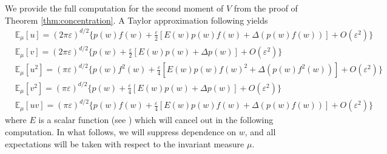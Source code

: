 \documentclass[11pt]{article}
\theoremstyle{plain}
\theoremstyle{definition}
\theoremstyle{remark}
\numberwithin{equation}{section}
\newcommand{\veps}{\varepsilon}
\newcommand{\E}{\mathbb{E}}
\begin{document}
\setcounter{table}{0}
\setcounter{figure}{0}
\renewcommand{\thetable}{D.\arabic{table}}
\renewcommand{\thefigure}{D.\arabic{figure}}
We provide the full computation for the second moment of $V$ from the proof of Theorem \ref{thm:concentration}. A Taylor approximation following \citet[Equation (28)]{singer2008nonlinear} yields
\begin{align*}
&\E_\mu [u]=(2\pi \veps)^{d/2} \{p(w) f(w)+\frac{\veps}{2}[E(w) p(w) f(w)+ \Delta (p(w) f(w))]+O(\veps^2) \}\\
&\E_\mu [v]=(2\pi \veps)^{d/2} \{p(w)+\frac{\veps}{2}[E(w) p(w) + \Delta p(w)]+O(\veps^2) \}\\
&\E_\mu [u^2]=(\pi \veps)^{d/2} \{p(w) f^2(w)+\frac{\veps}{4}[E(w) p(w) f(w)^2+ \Delta (p(w) f^2(w))]+O(\veps^2) \}\\
&\E_\mu [v^2]=(\pi \veps)^{d/2} \{p(w)+\frac{\veps}{4}[E(w) p(w) + \Delta p(w)]+O(\veps^2) \}\\
&\E_\mu [u v]=(\pi \veps)^{d/2} \{p(w) f(w) +\frac{\veps}{4}[E(w) p(w) f(w)  + \Delta (p(w) f(w))]+O(\veps^2) \}
\end{align*}
where $E$ is a scalar function (see \citet[Paragraph following Equation (28)]{singer2008nonlinear}) which will cancel out in the following computation. In what follows, we will suppress dependence on $w$, and all expectations will be taken with respect to the invariant measure $\mu$.
\end{document}
